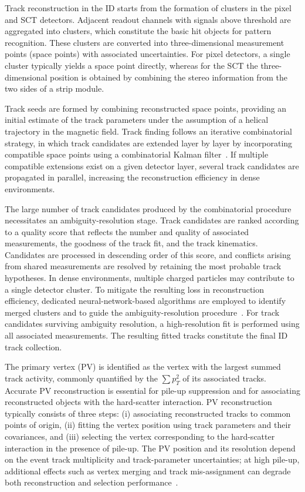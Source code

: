 Track reconstruction in the ID starts from the formation of clusters in the pixel
and SCT detectors.
Adjacent readout channels with signals above threshold are aggregated into
clusters, which constitute the basic hit objects for pattern recognition.
These clusters are converted into three-dimensional measurement points (space
points) with associated uncertainties.
For pixel detectors, a single cluster typically yields a space point directly,
whereas for the SCT the three-dimensional position is obtained by combining
the stereo information from the two sides of a strip module.

Track seeds are formed by combining reconstructed space points, providing an
initial estimate of the track parameters under the assumption of a helical
trajectory in the magnetic field.
Track finding follows an iterative combinatorial strategy, in which track
candidates are extended layer by layer by incorporating compatible space points
using a combinatorial Kalman filter~\cite{Fruhwirth1987KalmanTrackVertex}.
If multiple compatible extensions exist on a given detector layer, several
track candidates are propagated in parallel, increasing the reconstruction
efficiency in dense environments.

The large number of track candidates produced by the combinatorial procedure
necessitates an ambiguity-resolution stage.
Track candidates are ranked according to a quality score that reflects the number
and quality of associated measurements, the goodness of the track fit, and the
track kinematics.
Candidates are processed in descending order of this score, and conflicts arising
from shared measurements are resolved by retaining the most probable track
hypotheses.
In dense environments, multiple charged particles may contribute to a single
detector cluster.
To mitigate the resulting loss in reconstruction efficiency, dedicated
neural-network-based algorithms are employed to identify merged clusters and to
guide the ambiguity-resolution procedure~\cite{ATLASPixelNNClustering2014}.
For track candidates surviving ambiguity resolution, a high-resolution fit is
performed using all associated measurements.
The resulting fitted tracks constitute the final ID track collection.

The primary vertex (PV) is identified as the vertex with the largest summed track
activity, commonly quantified by the $\sum p_T^2$ of its associated tracks.
Accurate PV reconstruction is essential for pile-up suppression and for
associating reconstructed objects with the hard-scatter interaction.
PV reconstruction typically consists of three steps:
(i) associating reconstructed tracks to common points of origin,
(ii) fitting the vertex position using track parameters and their covariances,
and (iii) selecting the vertex corresponding to the hard-scatter interaction in
the presence of pile-up.
The PV position and its resolution depend on the event track multiplicity and
track-parameter uncertainties; at high pile-up, additional effects such as vertex
merging and track mis-assignment can degrade both reconstruction and selection
performance~\cite{ATLASPrimaryVertices2017}.

